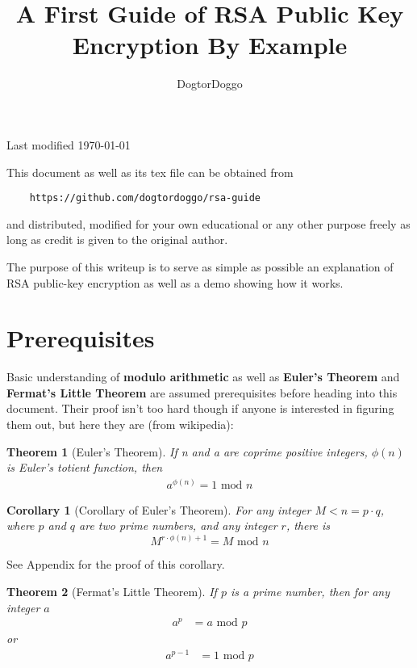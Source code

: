 \documentclass[]{paper}
\title{A First Guide of RSA Public Key Encryption By Example}
\author{DogtorDoggo}
\newtheorem{theorem}{Theorem}
\newtheorem{corollary}{Corollary}[theorem]
\begin{document}
\maketitle
\noindent Last modified \today
\vspace*{1\baselineskip}


This document as well as its tex file can be obtained from 

\begin{verbatim}
    https://github.com/dogtordoggo/rsa-guide
\end{verbatim}
and distributed, modified for your own educational or any other purpose freely as long as credit is given to the original author.

The purpose of this writeup is to serve as simple as possible an explanation of RSA public-key encryption as well as a demo showing how it works.
\section*{Prerequisites}
Basic understanding of \textbf{modulo arithmetic} as well as \textbf{Euler's Theorem} and \textbf{Fermat's Little Theorem} are assumed prerequisites before heading into this document. Their proof isn't too hard though if anyone is interested in figuring them out, but here they are (from wikipedia):

\begin{theorem}[Euler's Theorem]
If n and a are coprime positive integers, $\phi(n)$ is Euler's totient function, then
\begin{align*}
    a^{\phi(n)} = 1 \text{ mod } n
\end{align*}
\end{theorem}
\begin{corollary}[Corollary of Euler's Theorem]
For any integer $M < n=p\cdot q$, where $p$ and $q$ are two prime numbers, and any integer $r$, there is
\begin{equation*}
M^{r\cdot \phi(n) + 1} = M \text{ mod } n
\end{equation*} 
\end{corollary}
See Appendix for the proof of this corollary.
\begin{theorem}[Fermat's Little Theorem]
If $p$ is a prime number, then for any integer $a$
\begin{align*}
    a^p &= a \text{ mod } p
\end{align*}
or
\begin{align*}
    a^{p-1} &= 1 \text{ mod } p
\end{align*}
\end{theorem}
\newpage
\end{document}
